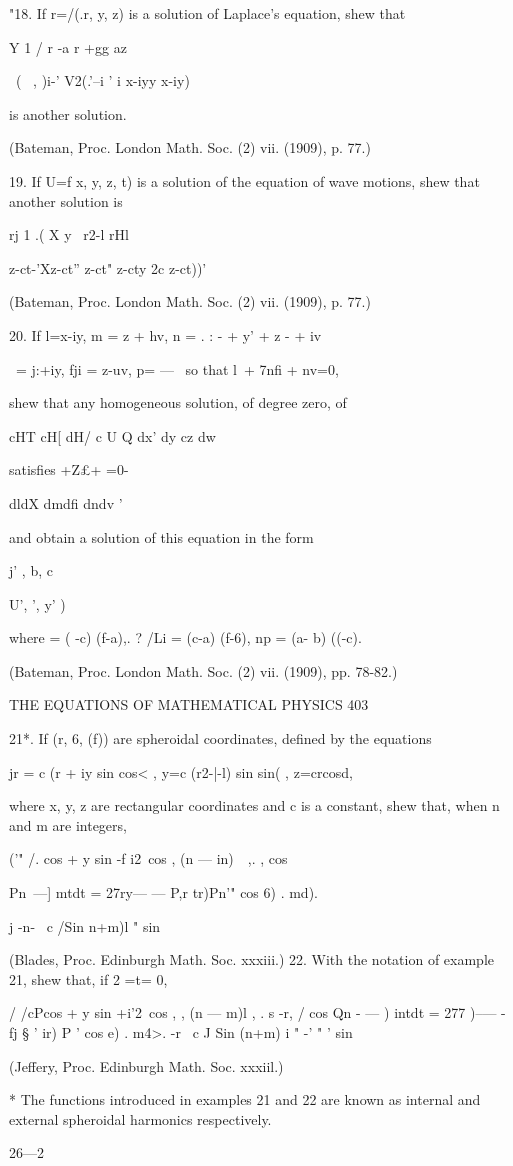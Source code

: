 "18. If r=/(.r, y, z) is a solution of Laplace's equation, shew that

Y 1 / r -a r +gg az \

~( \ , )i-' V2(.'--i ' i x-iyy x-iy)

is another solution.

(Bateman, Proc. London Math. Soc. (2) vii. (1909), p. 77.)

19. If U=f x, y, z, t) is a solution of the equation of wave motions,
shew that another solution is

rj 1 .( X y \ r2-l rHl \

z-ct-'Xz-ct'' z-ct" z-cty 2c z-ct))'

(Bateman, Proc. London Math. Soc. (2) vii. (1909), p. 77.)

20. If l=x-iy, m = z + hv, n = . : - + y' + z - + iv%

\ = j:+iy, fji = z-uv, p= — \, so that l\ + 7nfi + nv=0,

shew that any homogeneous solution, of degree zero, of

cHT cH[ dH/ c U Q dx' dy cz dw

satisfies +Z£+ =0-

dldX dmdfi dndv '

and obtain a solution of this equation in the form

j' , b, c \

U', ', y' )

where = ( -c) (f-a),. ? /Li = (c-a) (f-6), np = (a- b) ((-c).

(Bateman, Proc. London Math. Soc. (2) vii. (1909), pp. 78-82.)



THE EQUATIONS OF MATHEMATICAL PHYSICS 403

21*. If (r, 6, (f)) are spheroidal coordinates, defined by the
equations

jr = c (r + iy sin cos< , y=c (r2-|-l) sin sin( , z=crcosd,

where x, y, z are rectangular coordinates and c is a constant, shew
that, when n and m are integers,

('" /. cos + y sin -f i2\ cos , (n — in)\ \ ,. , cos

Pn\ —] mtdt = 27ry— — P,r tr)Pn'" cos 6) . md).

j -n- \ c /Sin n+m)l " sin

(Blades, Proc. Edinburgh Math. Soc. xxxiii.) 22. With the notation of
example 21, shew that, if 2 =t= 0,

/ /cPcos + y sin +i'2\ cos , , (n — m)l , . s -r, / cos Qn - — ) intdt
= 277 )--— -fj § ' ir) P ' cos e) . m4>. -r \ c J Sin (n+m) i " -' " '
sin

(Jeffery, Proc. Edinburgh Math. Soc. xxxiil.)

* The functions introduced in examples 21 and 22 are known as internal
and external spheroidal harmonics respectively.



26—2

